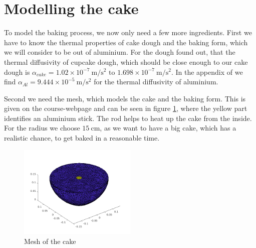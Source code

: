 \section{\label{sec::modelling}Modelling the cake}
To model the baking process, we now only need a few more ingredients. First we have to know the thermal properties of cake dough and the baking form, which we will consider to be out of aluminium. For the dough \cite{baik1999modeling} found out, that the thermal diffusivity of cupcake dough, which should be close enough to our cake dough is $\alpha_{cake}=1.02\times 10^{-7} \SI{}{\meter/\second^2 } \text{ to } 1.698\times 10^{-7} \SI{}{\meter/\second^2}$. In the appendix of \cite{kothandaraman2006fundamentals} we find $\alpha_{Al} = 9.444\times 10^{-5} \SI{}{\meter/\second^2}$ for the thermal diffusivity of aluminium.

Second we need the mesh, which models the cake and the baking form. This is given on the course-webpage and can be seen in figure \ref{fig::mesh}, where the yellow part identifies an aluminium stick. The rod helps to heat up the cake from the inside. For the radius we choose $15\SI{}{\centi\meter}$, as we want to have a big cake, which has a realistic chance, to get baked in a reasonable time.

\begin{figure}[htp]
        \centering
        \includegraphics[width=0.5\textwidth]{figures/mesh.png}
        \caption{\label{fig::mesh} Mesh of the cake}
\end{figure}
